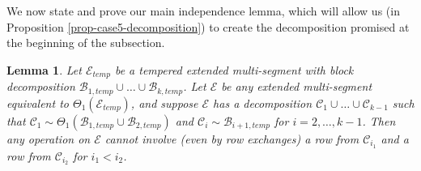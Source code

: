 \documentclass[11pt,letterpaper]{amsart}
\newcommand{\BB}{\mathcal{B}}
\newcommand{\CC}{\mathcal{C}}
\newcommand{\EE}{\mathcal{E}}
\newtheorem{lemma}[thm]{Lemma}
\numberwithin{equation}{section}
\begin{document}
We now state and prove our main independence lemma, which will allow us (in Proposition \ref{prop-case5-decomposition}) to create the decomposition promised at the beginning of the subsection.

\begin{lemma}
\label{lem-case5-independence}
    Let $\EE_{temp}$ be a tempered extended multi-segment with block decomposition $\BB_{1, temp} \cup \dots \cup \BB_{k, temp}$. Let $\EE$ be any extended multi-segment equivalent to $\Theta_1(\EE_{temp})$, and suppose $\EE$ has a decomposition $\CC_1 \cup \dots \cup \CC_{k-1}$ such that $\CC_1 \sim \Theta_1(\BB_{1, temp} \cup \BB_{2, temp})$ and $\CC_i \sim \BB_{i+1, temp}$ for $i = 2, \dots, k-1$. Then any operation on $\EE$ cannot involve (even by row exchanges) a row from $\CC_{i_1}$ and a row from $\CC_{i_2}$ for $i_1 < i_2$.
\end{lemma}
\end{document}
